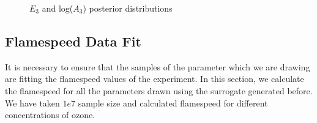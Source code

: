  \begin{figure}[H]      
            \caption{$E_3$ and log($A_3$) posterior distributions}
\end{figure}

\subsection{Flamespeed Data Fit}

 It is necessary to ensure that the samples of the parameter which we are drawing are fitting the flamespeed values of the experiment. In this section, we calculate the flamespeed for all the parameters drawn using the surrogate generated before. We have taken $1e7$ sample size and calculated flamespeed for different concentrations of ozone. 

